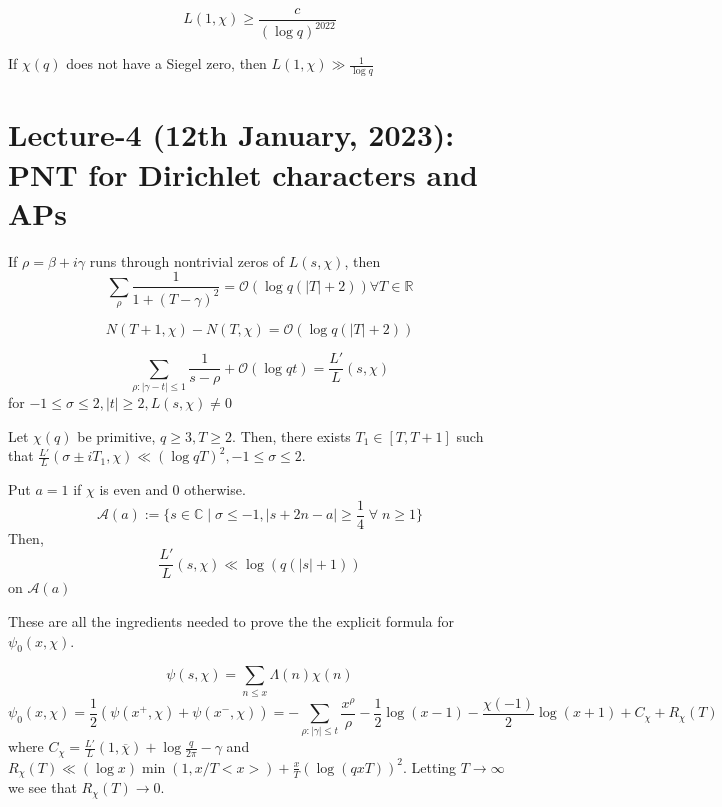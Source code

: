 \documentclass[oneside, 12pt]{scrbook}
\newcommand{\CC}{\mathbb C}
\newcommand{\RR}{\mathbb R}
\theoremstyle{theorem}
\begin{document}
\begin{theorem}[Y. Zhang]
$$L(1, \chi) \geq \frac{c}{(\log q)^{2022}}$$
\end{theorem}

\begin{theorem}
If $\chi(q)$ does not have a Siegel zero, then $L(1, \chi) \gg \frac{1}{\log q}$
\end{theorem}


\chapter{Lecture-4 (12th January, 2023): PNT for Dirichlet characters and APs}

\begin{lemma}
If $\rho = \beta + i \gamma$ runs through nontrivial zeros of $L(s, \chi)$, then $$\sum_{\rho} \frac{1}{1 + (T - \gamma)^2} = \mathcal{O} (\log q(|T| + 2)) \forall T \in \RR $$
\end{lemma}

\begin{lemma}
$$N(T+1, \chi) - N(T , \chi) = \mathcal{O} (\log q (|T| + 2))$$
\end{lemma}

\begin{lemma}
$$\sum_{\rho: |\gamma - t|\le 1} \frac{1}{s - \rho} + \mathcal{O}(\log qt) = \frac{L'}{L}(s,\chi)$$ for $-1 \le \sigma \le 2 , |t|\geq 2, L(s,\chi) \neq 0$
\end{lemma}

\begin{lemma}
Let $\chi(q)$ be primitive, $q \geq 3, T \geq 2$. Then, there exists $T_{1} \in [T,T+1]$ such that $\frac{L'}{L}(\sigma \pm iT_{1}, \chi) \ll (\log qT)^2 , -1 \le \sigma \le 2$.
\end{lemma}

\begin{lemma}
Put $a=1$ if $\chi$ is even and $0$ otherwise. $$\mathcal{A}(a) := \{ s \in \CC \mid \sigma \le -1 , |s + 2n - a| \geq \frac{1}{4} \; \forall \; n \geq 1\}$$ Then, $$\frac{L'}{L} (s, \chi) \ll \log (q(|s|+1))$$ on $\mathcal{A}(a)$
\end{lemma}

These are all the ingredients needed to prove the the explicit formula for $\psi_{0}(x, \chi)$. 

\begin{theorem}
$$\psi(s,\chi) = \sum_{n \le x} \Lambda(n) \chi(n)$$ $$\psi_{0}(x,\chi)  = \frac{1}{2}(\psi(x^{+}, \chi) + \psi(x^{-}, \chi)) = - \sum_{\rho : |\gamma|\le t} \frac{x^{\rho}}{\rho} - \frac{1}{2} \log (x-1) - \frac{\chi(-1)}{2} \log (x+1) + C_{\chi} + R_{\chi}(T)$$ where $C_{\chi} = \frac{L'}{L} (1, \overline{\chi}) + \log \frac{q}{2 \pi} - \gamma$ and $R_{\chi}(T) \ll (\log x)\min(1, x/T <x>) + \frac{x}{T} (\log (qxT))^2$. Letting $T \rightarrow \infty$ we see that $R_{\chi}(T) \rightarrow 0$.
\end{theorem}
\end{document}

